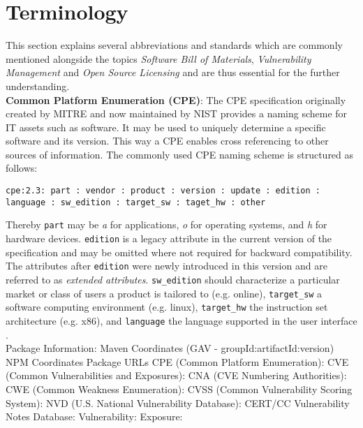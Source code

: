 
\section{Terminology}
This section explains several abbreviations and standards which are commonly mentioned alongside the topics \textit{Software Bill of Materials}, \textit{Vulnerability Management} and \textit{Open Source Licensing} and are thus essential for the further understanding.\\

\noindent
\textbf{Common Platform Enumeration (CPE)}: The CPE specification originally created by MITRE and now maintained by NIST provides a naming scheme for IT assets such as software. It may be used to uniquely determine a specific software and its version. This way a CPE enables cross referencing to other sources of information. The commonly used CPE naming scheme is structured as follows:\\
\noindent
\begin{lstlisting}[caption=CPE Formatted String Binding, captionpos=b, label=lst:CPE]
cpe:2.3: part : vendor : product : version : update : edition : language : sw_edition : target_sw : taget_hw : other
\end{lstlisting}

\noindent
Thereby \lstinline|part| may be \textit{a} for applications, \textit{o} for operating systems, and \textit{h} for hardware devices. \lstinline|edition| is a legacy attribute in the current version of the specification and may be omitted where not required for backward compatibility. The attributes after \lstinline|edition| were newly introduced in this version and are referred to as \textit{extended attributes}. \lstinline|sw_edition| should characterize a particular market or class of users a product is tailored to (e.g. online), \lstinline|target_sw| a software computing environment (e.g. linux), \lstinline|target_hw| the instruction set architecture (e.g. x86), and \lstinline|language| the language supported in the user interface \cite{CPESpec}.\\

Package Information:
	Maven Coordinates (GAV - groupId:artifactId:version)
	NPM Coordinates 
	Package URLs
CPE (Common Platform Enumeration):
CVE (Common Vulnerabilities and Exposures):
CNA (CVE Numbering Authorities):
CWE (Common Weakness Enumeration):
CVSS (Common Vulnerability Scoring System):
NVD (U.S. National Vulnerability Database):
CERT/CC Vulnerability Notes Database: 
Vulnerability:
Exposure:

